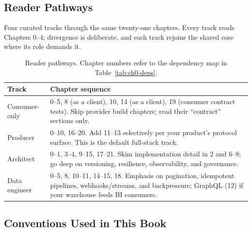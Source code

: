 \subsection{Reader Pathways}
\label{sec:ch0-pathways}

Four curated tracks through the same twenty-one chapters. Every track reads
Chapters 0--4; divergence is deliberate, and each track rejoins the shared
core where its role demands it.

\begin{table}[h]
  \centering
  \small
  \begin{tabularx}{\textwidth}{l X}
    \toprule
    \textbf{Track} & \textbf{Chapter sequence} \\
    \midrule
    Consumer-only &
      0--5, 8 (as a client), 10, 14 (as a client), 19 (consumer contract
      tests). Skip provider build chapters; read their ``contract'' sections
      only. \\
    Producer &
      0--10, 16--20. Add 11--13 selectively per your product's protocol
      surface. This is the default full-stack track. \\
    Architect &
      0--1, 3--4, 9--15, 17--21. Skim implementation detail in 2 and 6--8;
      go deep on versioning, resilience, observability, and governance. \\
    Data engineer &
      0--5, 8, 10--11, 14--15, 18. Emphasis on pagination, idempotent
      pipelines, webhooks/streams, and backpressure; GraphQL (12) if your
      warehouse feeds BI consumers. \\
    \bottomrule
  \end{tabularx}
  \caption{Reader pathways. Chapter numbers refer to the dependency map in
    Table~\ref{tab:ch0-deps}.}
  \label{tab:ch0-pathways}
\end{table}

\subsection{Conventions Used in This Book}

